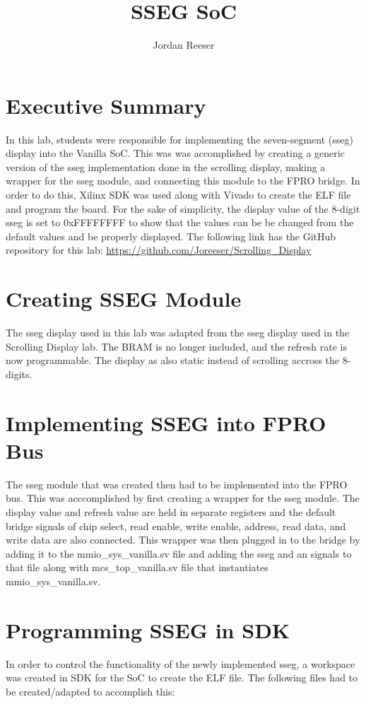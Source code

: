 \documentclass{article}
\author{Jordan Reeser}
\title{SSEG SoC}
\begin{document}
\maketitle

\section{Executive Summary}
In this lab, students were responsible for implementing the seven-segment (sseg) display into the Vanilla SoC. This was was accomplished by creating a generic version of the sseg implementation done in the scrolling display, making a wrapper for the sseg module, and connecting this module to the FPRO bridge. In order to do this, Xilinx SDK was used along with Vivado to create the ELF file and program the board. For the sake of simplicity, the display value of the 8-digit sseg is set to 0xFFFFFFFF to show that the values can be be changed from the default values and be properly displayed. The following link has the GitHub repository for this lab: \url{https://github.com/Joreeser/Scrolling_Display}

\section{Creating SSEG Module}
The sseg display used in this lab was adapted from the sseg display used in the Scrolling Display lab. The BRAM is no longer included, and the refresh rate is now programmable. The display as also static instead of scrolling accross the 8-digits. 

\section{Implementing SSEG into FPRO Bus}
The sseg module that was created then had to be implemented into the FPRO bus. This was acccomplished by first creating a wrapper for the sseg module. The display value and refresh value are held in separate registers and the default bridge signals of chip select, read enable, write enable, address, read data, and write data are also connected. This wrapper was then plugged in to the bridge by adding it to the mmio\_sys\_vanilla.sv file and adding the sseg and an signals to that file along with mcs\_top\_vanilla.sv file that instantiates mmio\_sys\_vanilla.sv.

\section{Programming SSEG in SDK}
In order to control the functionality of the newly implemented sseg, a workspace was created in SDK for the SoC to create the ELF file. The following files had to be created/adapted to accomplish this:
\end{document}

